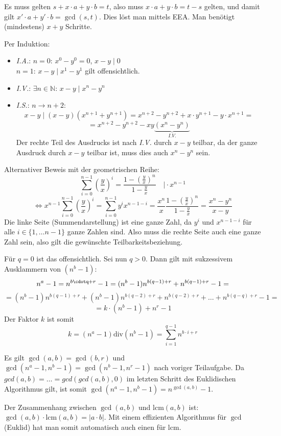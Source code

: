 \begin{flushenum}
\begin{flushalpha}
	\item Es muss gelten $s + x\cdot a + y \cdot b = t$, also muss $x\cdot a + y\cdot b = t-s$ gelten,
	und damit gilt $x'\cdot a + y' \cdot b = \gcd(s,t)$. Dies
	löst man mittels EEA. Man benötigt (mindestens) $x+y$ Schritte.
\end{flushalpha}

\item 
\begin{flushalpha}
\item Per Induktion:
\begin{itemize}
	\item \textit{I.A.}: $n=0$: $x^0 - y^0 = 0$, $x-y \mid 0$ \\ $n=1$: $x-y \mid x^1 - y^1$ gilt offensichtlich.
	\item \textit{I.V.}: $\exists n \in \mathbb{N}$: $x-y \mid x^n - y^n$
	\item \textit{I.S.}: $n \rightarrow n+2$:
	\[ x-y \mid (x-y)(x^{n+1} + y^{n+1}) = x^{n+2} - y^{n+2} + x\cdot y^{n+1} - y \cdot x^{n+1} =\]
	\[ = x^{n+2} - y^{n+2} - xy \underbrace{(x^{n} - y^{n})}_{I.V.}\]
	Der rechte Teil des Ausdrucks ist nach \textit{I.V.} durch $x-y$ teilbar, da der ganze Ausdruck durch $x-y$ teilbar ist, muss dies auch $x^n - y^n$ sein.
\end{itemize}
Alternativer Beweis mit der geometrischen Reihe:
\[ \sum_{i=0}^{n-1}\left(\frac{y}{x}\right)^i = \frac{1-\left(\frac{y}{x}\right)^n}{1-\frac{y}{x}} \quad \vert \cdot x^{n-1}\]
\[ \Leftrightarrow x^{n-1}  \sum_{i=0}^{n-1}\left(\frac{y}{x}\right)^i = \sum_{i=0}^{n-1} y^ix^{n-1-i} = \frac{x^n}{x}  \frac{1-\left(\frac{y}{x}\right)^n}{1-\frac{y}{x}}  = \frac{x^n - y^n}{x-y} \]
Die linke Seite (Summendarstellung) ist eine ganze Zahl, da $y^i$ und $x^{n-1-i}$ für alle $i \in \{1, \ldots n-1\}$ ganze Zahlen sind. Also muss
die rechte Seite auch eine ganze Zahl sein, also gilt die gewünschte Teilbarkeitsbeziehung.

\item Für $q=0$ ist das offensichtlich. Sei nun $q>0$. Dann gilt mit sukzessivem Ausklammern von $(n^b - 1)$:
\[
  n^a - 1 = n^{b\cdotq + r} - 1 = (n^b - 1)n^{b(q-1) + r} + n^{b(q-1) + r}-1 =
\]
\[
  = (n^b - 1)n^{b(q-1) + r} + (n^b - 1)n^{b(q-2) + r} + n^{b(q-2) + r} + \ldots
  +n^{b(q-q) + r} - 1 =\]\[= k \cdot (n^b-1) + n^r - 1
\]
Der Faktor $k$ ist somit \[ k = (n^a-1) \text{div} (n^b -1) = \sum_{i=1}^{q-1} n^{b\cdot i + r} \]
\item Es gilt $\gcd(a,b) = \gcd(b,r)$ und $\gcd(n^a-1,n^b-1) = \gcd(n^b-1,n^r-1)$ nach voriger Teilaufgabe.
Da $gcd(a,b) = \ldots = gcd( gcd(a,b), 0)$ im letzten Schritt des Euklidischen Algorithmus gilt, ist somit $\gcd(n^a -1,n^b-1) = n^{\gcd(a,b)}-1$.
\end{flushalpha}
\item Der Zusammenhang zwischen $\gcd(a,b)$ und $\text{lcm}(a,b)$ ist: $\gcd(a,b) \cdot \text{lcm}(a,b) = |a \cdot b|$. Mit einem effizienten Algorithmus für $\gcd$ (Euklid)
hat man somit automatisch auch einen für $\text{lcm}$.


\end{flushenum}
